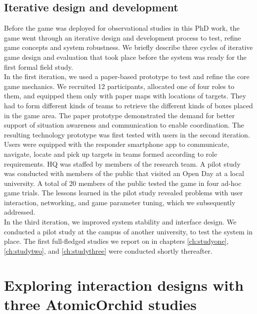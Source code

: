 \subsection{Iterative design and development}
Before the game was deployed for observational studies in this PhD work, the game went through an iterative design and development process to test, refine game concepts and system robustness. We briefly describe three cycles of iterative game design and evaluation that took place before the system was ready for the first formal field study.\\

In the first iteration, we used a paper-based prototype to test and refine the core game mechanics. We recruited 12 participants, allocated one of four roles to them, and equipped them only with paper maps with locations of targets. They had to form different kinds of teams to retrieve the different kinds of boxes placed in the game area. The paper prototype demonstrated the demand for better support of situation awareness and communication to enable coordination. The resulting technology prototype was first tested with users in the second iteration. Users were equipped with the responder smartphone app to communicate, navigate, locate and pick up targets in teams formed according to role requirements. HQ was staffed by members of the research team. A pilot study was conducted with members of the public that visited an Open Day at a local university. A total of 20 members of the public tested the game in four ad-hoc game trials. The lessons learned in the pilot study revealed problems with user interaction, networking, and game parameter tuning, which we subsequently addressed.\\

In the third iteration, we improved system stability and interface design. We conducted a pilot study at the campus of another university, to test the system in place. The first full-fledged studies we report on in chapters \ref{ch:studyone}, \ref{ch:studytwo}, and \ref{ch:studythree} were conducted shortly thereafter.\\


\section{Exploring interaction designs with three AtomicOrchid studies}\label{sec:patterns} \label{sec:approachPatterns}


